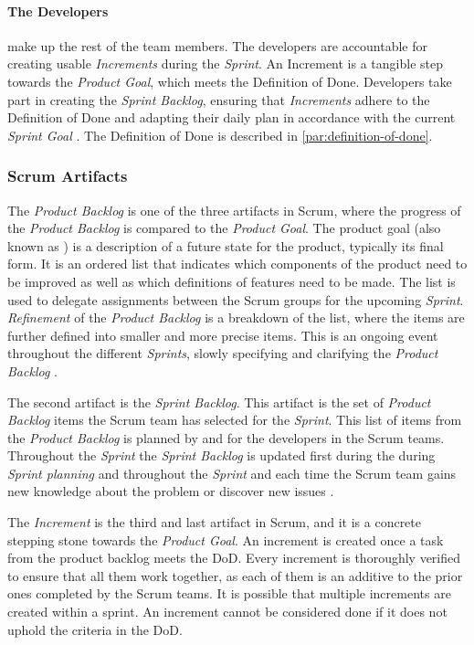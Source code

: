 \paragraph{The Developers}
make up the rest of the team members.
The developers are accountable for creating usable \emph{Increments} during the \emph{Sprint}. 
An Increment is a tangible step towards the \emph{Product Goal}, which meets the Definition of Done. 
Developers take part in creating the \emph{Sprint Backlog}, ensuring that \emph{Increments} adhere to the Definition of Done and adapting their daily plan in accordance with the current \emph{Sprint Goal} \cite{schwaber_sutherland_2022}.
The Definition of Done is described in \autoref{par:definition-of-done}.

\subsubsection{Scrum Artifacts}
The \emph{Product Backlog} is one of the three artifacts in Scrum, where the progress of the \emph{Product Backlog} is compared to the \emph{Product Goal}.
The product goal (also known as ) is a description of a future state for the product, typically its final form.
It is an ordered list that indicates which components of the product need to be improved as well as which definitions of features need to be made.
The list is used to delegate assignments between the Scrum groups for the upcoming \emph{Sprint}.
\emph{Refinement} of the \emph{Product Backlog} is a breakdown of the list, where the items are further defined into smaller and more precise items.
This is an ongoing event throughout the different \emph{Sprints}, slowly specifying and clarifying the \emph{Product Backlog} \cite{schwaber_sutherland_2022}. 

The second artifact is the \emph{Sprint Backlog}. 
This artifact is the set of \emph{Product Backlog} items the Scrum team has selected for the \emph{Sprint}. 
This list of items from the \emph{Product Backlog} is planned by and for the developers in the Scrum teams. 
Throughout the \emph{Sprint} the \emph{Sprint Backlog} is updated first during the during \emph{Sprint planning} and throughout the \emph{Sprint} and each time the Scrum team gains new knowledge about the problem or discover new issues \cite{schwaber_sutherland_2022}. 

The \emph{Increment} is the third and last artifact in Scrum, and it is a concrete stepping stone towards the \emph{Product Goal}.
An increment is created once a task from the product backlog meets the DoD. 
Every increment is thoroughly verified to ensure that all them work together, as each of them is an additive to the prior ones completed by the Scrum teams.
It is possible that multiple increments are created within a sprint.
An increment cannot be considered done if it does not uphold the criteria in the DoD\cite{schwaber_sutherland_2022}.

